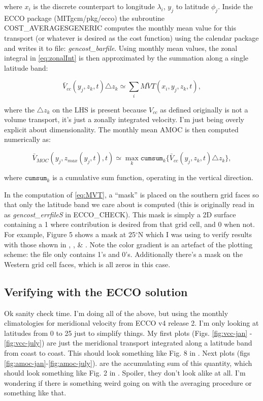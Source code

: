 \documentclass[a4paper,11pt]{article}
\begin{document}
  where $x_i$ is the discrete counterpart to longitude $\lambda_i$, $y_j$ to latitude $\phi_j$. Inside the ECCO package (MITgcm/pkg/ecco) the subroutine COST\_AVERAGESGENERIC computes the monthly mean value for this transport  (or whatever is desired as the cost function) using the calendar package and writes it to file: \textit{gencost\_barfile}. Using monthly mean values, the zonal integral in \ref{eq:zonalInt} is then approximated by the summation along a single latitude band: 
  
  \begin{equation}
   \bar{V}_{cc}(y_j,z_k,t) \triangle z_k \simeq \sum_i \bar{MVT}(x_i,y_j,z_k,t) ,
   \label{eq:vccApprox}
  \end{equation}

  where the $\triangle z_k$ on the LHS is present because $V_{cc}$ as defined originally is not a volume transport, it's just a zonally integrated velocity. I'm just being overly explicit about dimensionality. 
  The monthly mean AMOC is then computed numerically as: 
  
  \begin{equation}
   \bar{V}_{MOC}(y_j,z_{max}(y_j,t),t) \simeq \max_{k} \texttt{cumsum}_k \{\bar{V}_{cc}(y_j,z_k,t)\triangle z_k\} ,
   \label{eq:amocApprox}
  \end{equation}

  where $\texttt{cumsum}_k$ is a cumulative sum function, operating in the vertical direction. 
  
  In the computation of \ref{eq:MVT}, a ``mask'' is placed on the southern grid faces so that only the latitude band we care about is computed (this is originally read in as \textit{gencost\_errfileS} in ECCO\_CHECK). This mask is simply a 2D surface containing a 1 where contribution is desired from that grid cell, and 0 when not. For example, Figure 5 shows a mask at 25$^\circ$N which I was using to verify results with those shown in \cite{wunschLinear}, \cite{wunschAndHeimbach_AMOC}, \& \cite{mcCarthy}. Note the color gradient is an artefact of the plotting scheme: the file only contains 1's and 0's. Additionally there's a mask on the Western grid cell faces, which is all zeros in this case. 
  
  \subsection{Verifying with the ECCO solution}
  
  Ok sanity check time. I'm doing all of the above, but using the monthly climatologies for meridional velocity from ECCO v4 release 2. I'm only looking at latitudes from 0 to 25 just to simplify things. My first plots (Figs. \ref{fig:vcc-jan} - \ref{fig:vcc-july}) are just the meridional transport integrated along a latitude band from coast to coast. This should look something like Fig. 8 in \cite{wunschLinear}. Next plots (figs \ref{fig:amoc-jan}-\ref{fig:amoc-july}). are the accumulating sum of this quantity, which should look something like Fig. 2 in \cite{wunschAndHeimbach_AMOC}. Spoiler, they don't look alike at all. I'm wondering if there is something weird going on with the averaging procedure or something like that. 
  
\end{document}
